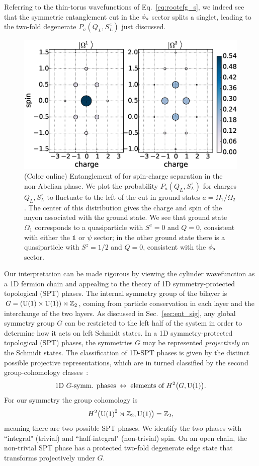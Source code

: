 Referring to the thin-torus wavefunctions of Eq.~\eqref{eq:rootcfg_s}, we indeed see that the symmetric entanglement cut in the ${\phi_s}$ sector splits a singlet, 
leading to the two-fold degenerate $P_\sigma(Q_L, S^z_L )$ just discussed.

\begin{figure}%
	\includegraphics[width=0.6\linewidth]{figures/charge_polarization.eps}
	\caption{(Color online)
		Entanglement of for spin-charge separation in the non-Abelian phase.
		We plot the probability $P_a(Q_L, S^z_L )$ for charges $Q_L, S^z_L $ to fluctuate to the left of the cut in ground states $a =\Omega_1 / \Omega_2$. 
		The center of this distribution gives the charge and spin of the anyon associated with the ground state. 
		We see that ground state $\Omega_1$ corresponds to a quasiparticle with $S^z=0$ and $Q = 0$, consistent with either the $\mathbb{1}$ or  $\psi$  sector; in the other ground state there is a quasiparticle with $S^z=1/2$ and $Q = 0$, consistent with the ${\phi_s}$ sector.
	}
	\label{charge}
\end{figure}

Our interpretation can be made rigorous by viewing the cylinder wavefunction  as a 1D fermion chain and appealing to the theory of 1D symmetry-protected topological (SPT) phases.
The internal symmetry group of the bilayer is $G = (\mathrm{U(1)} \times \mathrm{U(1)}) \rtimes \mathbb{Z}_2$, coming from particle conservation in each layer and the interchange of the two layers. 
As discussed in Sec.~\ref{sec:ent_sig},  any global symmetry group $G$ can be restricted to the left half of the system in order to determine how it acts on left Schmidt states.
In a 1D symmetry-protected topological (SPT) phases, the symmetries $G$ may be represented \emph{projectively} on the Schmidt states.
The classification of 1D-SPT phases is given by the distinct possible projective representations, which are in turned classified by the second group-cohomology classes~\cite{FidkowskiKitaev2011}:
\begin{align}
	\textrm{1D $G$-symm. phases} \;\leftrightarrow\; \textrm{elements of } H^2 \big( G, \mathrm{U(1)} \big).
\end{align}
For our symmetry the group cohomology is
\begin{align}
	H^2 \big( \mathrm{U(1)}^2 \rtimes \mathbb{Z}_2 , \mathrm{U(1)} \big) = \mathbb{Z}_2 ,
\end{align}
meaning there are two possible SPT phases.
We identify the two phases with ``integral" (trivial) and ``half-integral" (non-trivial) spin. 
On an open chain, the non-trivial SPT phase has a protected two-fold degenerate edge state that transforms projectively under $G$.

